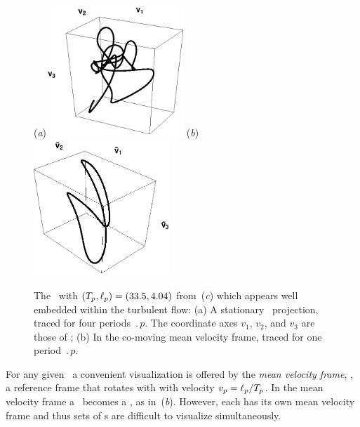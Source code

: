 \begin{figure}[t]
\begin{center}
(\textit{a})\includegraphics[width=0.46\textwidth]{figs/ks22rpo033.50_04.045E2.eps}
(\textit{b})\includegraphics[width=0.46\textwidth]{figs/ks22rpo033.50_04.045E2CM.eps}
\\
\end{center}
\caption{
 The
\rpo\ with $({T_{p}},\ell_p) =(33.5,4.04)$
from \,(\textit{c})
which appears well embedded within the turbulent flow:
 (a) A stationary \statesp\ projection,
  traced for four periods $\period{p}$. The coordinate axes
$v_1$, $v_2$, and $v_3$ are those of ;
 (b) In the co-moving mean velocity frame,
 traced for one period $\period{p}$.
        } \label{f:MeanVelocityFrame}
\end{figure}

For any given \rpo\ a convenient visualization is
offered by the {\em mean velocity frame}, {\ie},
a reference frame that rotates with with velocity
$v_p=\ell_p/{T_{p}}$.
In the mean velocity frame a \rpo\ becomes
a \po, as in \,(\textit{b}).
However, each {\rpo} has its own mean velocity frame and thus
sets of \rpo s are difficult to visualize simultaneously.

